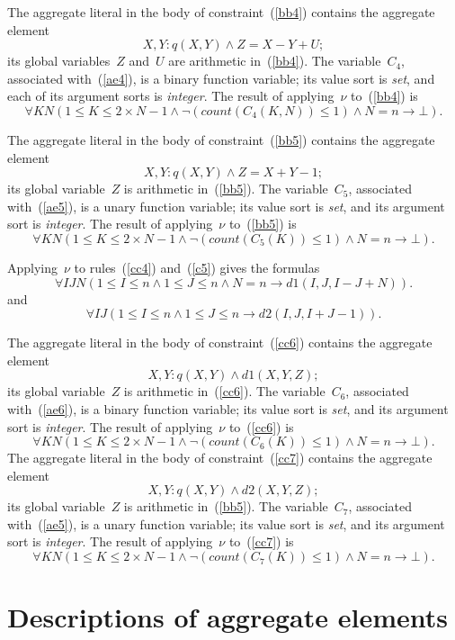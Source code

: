 \documentclass[11pt]{article}
\def\beq{\begin{equation}}
\def\eeq#1{\label{#1}\end{equation}}
\newcommand{\co}{\ensuremath{\mathit{count}}}
\begin{document}
\begin{adjustwidth}{-1cm}{-1cm}
The aggregate literal in the body of constraint~(\ref{bb4}) contains the
aggregate element
\beq
 X,Y : q(X,Y) \land Z = X-Y+U;
\eeq{ae4}
its global variables~$Z$ and~$U$ are arithmetic in~(\ref{bb4}).
The variable~$C_4$,
associated with~(\ref{ae4}), is a binary function variable; its value sort
is \emph{set}, and each of its argument sorts is \emph{integer}.
The result of applying~$\nu$ to~(\ref{bb4}) is
\beq
\forall KN
(1\leq K\leq 2\times N-1 \land\neg(\co(C_4(K,N))\leq 1)\wedge N=n\to\bot).
\eeq{b4f}

The aggregate literal in the body of constraint~(\ref{bb5}) contains the
aggregate element
\beq
 X,Y : q(X,Y) \land Z = X+Y-1;
\eeq{ae5}
its global variable~$Z$ is arithmetic in~(\ref{bb5}).
The variable~$C_5$,
associated with~(\ref{ae5}), is a unary function variable; its value sort
is \emph{set}, and its argument sort is \emph{integer}.
The result of applying~$\nu$ to~(\ref{bb5}) is
\beq
\forall KN
(1\leq K\leq 2\times N-1 \land\neg(\co(C_5(K))\leq 1)\wedge N=n\to\bot).
\eeq{b5f}

Applying~$\nu$ to rules~(\ref{cc4}) and~(\ref{c5}) gives the formulas
\beq
\forall I J  N(1\leq I\leq n \land 1\leq J\leq n  
 \wedge N=n\to d1(I,J,I-J+N)).
\eeq{c4f}
and
\beq
\forall I J  (1\leq I\leq n \land 1\leq J\leq n 
 \to d2(I,J,I+J-1)).
\eeq{c5f}

The aggregate literal in the body of constraint~(\ref{cc6}) contains the
aggregate element
\beq
 X,Y : q(X,Y) \land d1(X,Y,Z);
\eeq{ae6}
its global variable~$Z$ is arithmetic in~(\ref{cc6}).
The variable~$C_6$,
associated with~(\ref{ae6}), is a binary function variable; its value sort
is \emph{set}, and its argument sort is \emph{integer}.
The result of applying~$\nu$ to~(\ref{cc6}) is
\beq
\forall KN
(1\leq K\leq 2\times N-1 \land\neg(\co(C_6(K))\leq 1)\wedge N=n\to\bot).
\eeq{c6f}
The aggregate literal in the body of constraint~(\ref{cc7}) contains the
aggregate element
\beq
 X,Y : q(X,Y) \land d2(X,Y,Z);
\eeq{ae7}
its global variable~$Z$ is arithmetic in~(\ref{bb5}).
The variable~$C_7$,
associated with~(\ref{ae5}), is a unary function variable; its value sort
is \emph{set}, and its argument sort is \emph{integer}.
The result of applying~$\nu$ to~(\ref{cc7}) is
\beq
\forall KN
(1\leq K\leq 2\times N-1 \land\neg(\co(C_7(K))\leq 1)\wedge N=n\to\bot).
\eeq{c7f}

\section{Descriptions of aggregate elements}


\end{adjustwidth}
\end{document}
